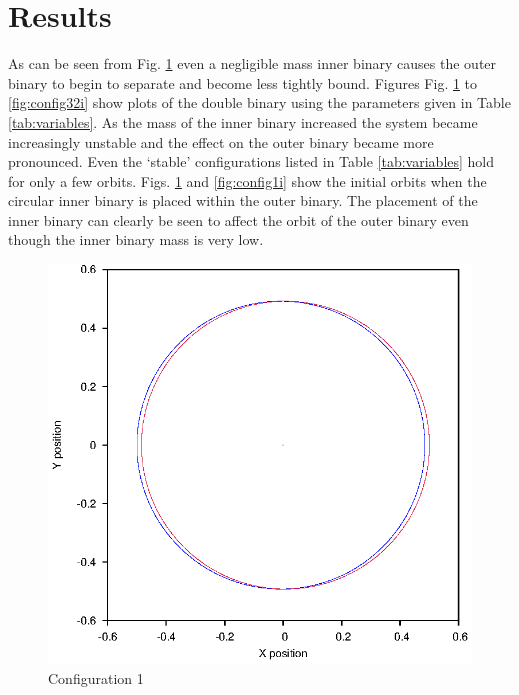 \documentclass[a4paper,12pt]{article}
\begin{document}
\section{Results}
As can be seen from Fig. \ref{fig:config1} even a negligible mass inner binary causes the outer binary to begin to separate and become less tightly bound.
Figures Fig. \ref{fig:config1} to \ref{fig:config32i} show plots of the double binary using the parameters given in Table \ref{tab:variables}.
As the mass of the inner binary increased the system became increasingly unstable and the effect on the outer binary became more pronounced.
Even the `stable' configurations listed in Table \ref{tab:variables} hold for only a few orbits.
Figs. \ref{fig:config1} and \ref{fig:config1i} show the initial orbits when the circular inner binary is placed within the outer binary. The placement of
the inner binary can clearly be seen to affect the orbit of the outer binary even though the inner binary mass is very low.
\begin{figure}[H]
\centering
\includegraphics[width=.9\textwidth]{./2016results/stablebase/Orbit.eps}
\caption{Configuration 1}
\label{fig:config1}
\end{figure}
\end{document}
